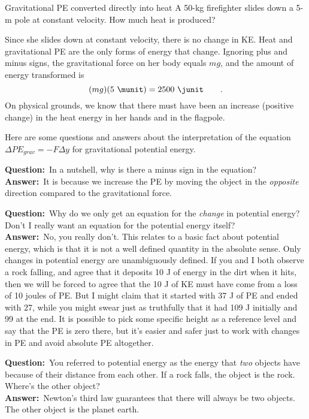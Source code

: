 \begin{eg}{Gravitational PE converted directly into heat}
\egquestion A 50-kg firefighter slides down a 5-m pole at
constant velocity. How much heat is produced?

\eganswer Since she slides down at constant velocity, there
is no change in KE. Heat and gravitational PE are the only
forms of energy that change. Ignoring plus and minus signs,
the gravitational force on her body equals $mg$, and
the amount of energy transformed is
\begin{equation*}
                (mg)(5\ \munit)  =  2500\ \junit   \qquad   .
\end{equation*}
On physical grounds, we know that there must have been an
increase (positive change) in the heat energy in her hands
and in the flagpole.
\end{eg}

Here are some questions and answers about the interpretation
of the equation $\Delta PE_{grav} =-F\Delta y$ for
gravitational potential energy.

\newcommand{\qandaquestion}{\noindent\textbf{Question:}\ }
\newcommand{\qandaanswer}{\\{}\noindent\textbf{Answer:}\ }

\qandaquestion In a nutshell, why is there a minus sign in the equation?
\qandaanswer It is because we increase the PE by moving the
object in the \emph{opposite} direction compared to the
gravitational force.

\qandaquestion Why do we only get an equation for the \emph{change}
in potential energy? Don't I really want an equation for the
potential energy itself?
\qandaanswer No, you really don't. This relates to a basic fact
about potential energy, which is that it is not a well
defined quantity in the absolute sense. Only changes in
potential energy are unambiguously defined. If you and I
both observe a rock falling, and agree that it deposits 10
J of energy in the dirt when it hits, then we will be
forced to agree that the 10 J of KE must have come from a
loss of 10 joules of PE. But I might claim that it started
with 37 J of PE and ended with 27, while you might swear
just as truthfully that it had 109 J initially and 99 at
the end. It is possible to pick some specific height as a
reference level and say that the PE is zero there, but it's
easier and safer just to work with changes in PE and avoid
absolute PE altogether.

\qandaquestion You referred to potential energy as the energy
that \emph{two} objects have because of their distance from
each other. If a rock falls, the object is the rock.
Where's the other object?
\qandaanswer Newton's third law guarantees that there will always
be two objects. The other object is the planet earth.


